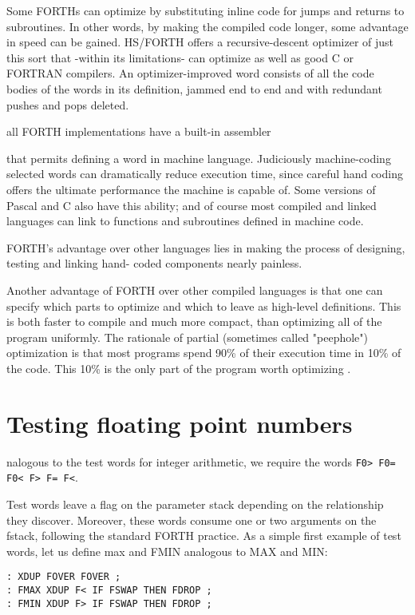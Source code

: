 Some FORTHs can optimize by substituting inline code for jumps
and returns to subroutines. In other words, by making the compiled code longer,
some advantage in speed can be gained.
HS/FORTH offers a recursive-descent optimizer of just this sort
that -within its limitations- can optimize as well as good C or
FORTRAN compilers. An optimizer-improved word consists of
all the code bodies of the words in its definition, jammed end to
end and with redundant pushes and pops deleted.

 all FORTH implementations have a built-in assembler

that permits defining a word in machine language. Judiciously
machine-coding selected words can dramatically reduce execution time, since
careful hand coding offers the ultimate performance the machine is capable of.
Some versions of Pascal and C
also have this ability; and of course most compiled and linked
languages can link to functions and subroutines defined in
machine code.

FORTH’s advantage over other languages lies in making the 
process of designing, testing and linking hand- coded components
nearly painless.

Another advantage of FORTH over other compiled languages is
that one can specify which parts to optimize and which to leave
as high-level definitions. This is both faster to compile and much
more compact, than optimizing all of the program uniformly. The
rationale of partial (sometimes called "peephole") optimization
is that most programs spend 90\% of their execution time in 10\%
of the code. This 10\% is the only part of the program worth
optimizing  .

\section{Testing floating point numbers}

 nalogous to the test words for integer arithmetic, we require
the words \verb|F0> F0= F0< F> F= F<|.

Test words leave a ﬂag on the parameter stack depending on the
relationship they discover. Moreover, these words consume one
or two arguments on the fstack, following the standard FORTH
practice. As a simple first example of test words, let us define
max and FMIN analogous to MAX and MIN: 
\begin{verbatim}
: XDUP FOVER FOVER ;
: FMAX XDUP F< IF FSWAP THEN FDROP ;
: FMIN XDUP F> IF FSWAP THEN FDROP ;
\end{verbatim}

